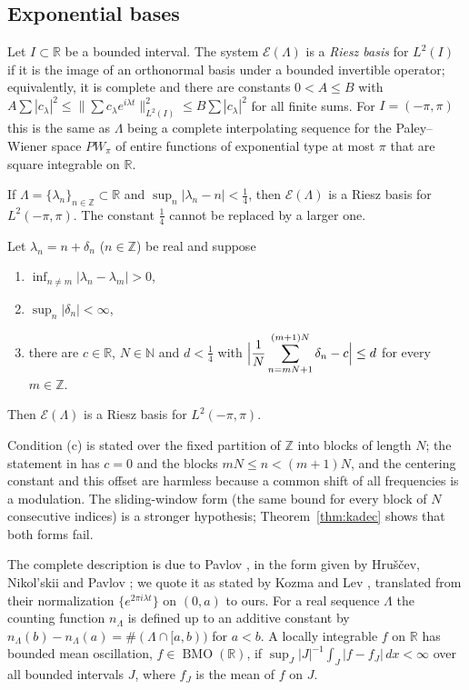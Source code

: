 \documentclass[11pt]{article}
\DeclareMathOperator{\BMO}{BMO}
\newcommand{\R}{\mathbb{R}}
\newcommand{\Z}{\mathbb{Z}}
\newcommand{\N}{\mathbb{N}}
\newcommand{\Lam}{\Lambda}
\newcommand{\E}{\mathcal{E}}
\begin{document}
\subsection{Exponential bases}
Let $I\subset\R$ be a bounded interval. The system $\E(\Lam)$ is a \emph{Riesz basis} for $L^2(I)$ if it is the image of an orthonormal basis under a bounded invertible operator; equivalently, it is complete and there are constants $0<A\le B$ with $A\sum|c_\lambda|^2\le\|\sum c_\lambda e^{i\lambda t}\|_{L^2(I)}^2\le B\sum|c_\lambda|^2$ for all finite sums. For $I=(-\pi,\pi)$ this is the same as $\Lam$ being a complete interpolating sequence for the Paley--Wiener space $PW_\pi$ of entire functions of exponential type at most $\pi$ that are square integrable on $\R$.

\begin{theorem}\label{thm:Kadec}
If $\Lam=\{\lambda_n\}_{n\in\Z}\subset\R$ and $\sup_n|\lambda_n-n|<\frac14$, then $\E(\Lam)$ is a Riesz basis for $L^2(-\pi,\pi)$. The constant $\frac14$ cannot be replaced by a larger one.
\end{theorem}

\begin{theorem}\label{thm:Avdonin}
Let $\lambda_n=n+\delta_n$ ($n\in\Z$) be real and suppose
\begin{enumerate}
\item[(a)] $\inf_{n\ne m}|\lambda_n-\lambda_m|>0$,
\item[(b)] $\sup_n|\delta_n|<\infty$,
\item[(c)] there are $c\in\R$, $N\in\N$ and $d<\frac14$ with $\displaystyle\Bigl|\frac1N\sum_{n=mN+1}^{(m+1)N}\delta_n-c\Bigr|\le d$ for every $m\in\Z$.
\end{enumerate}
Then $\E(\Lam)$ is a Riesz basis for $L^2(-\pi,\pi)$.
\end{theorem}

Condition (c) is stated over the fixed partition of $\Z$ into blocks of length $N$; the statement in \cite{AlemanyNitzan} has $c=0$ and the blocks $mN\le n<(m+1)N$, and the centering constant and this offset are harmless because a common shift of all frequencies is a modulation. The sliding-window form (the same bound for every block of $N$ consecutive indices) is a stronger hypothesis; Theorem~\ref{thm:kadec} shows that both forms fail.

The complete description is due to Pavlov \cite{Pavlov79}, in the form given by Hru\v{s}\v{c}ev, Nikol'skii and Pavlov \cite[p.~240]{HNP}; we quote it as stated by Kozma and Lev \cite[Theorem 5.1]{KozmaLev}, translated from their normalization $\{e^{2\pi i\lambda t}\}$ on $(0,a)$ to ours. For a real sequence $\Lam$ the counting function $n_\Lam$ is defined up to an additive constant by $n_\Lam(b)-n_\Lam(a)=\#(\Lam\cap[a,b))$ for $a<b$. A locally integrable $f$ on $\R$ has bounded mean oscillation, $f\in\BMO(\R)$, if $\sup_J|J|^{-1}\int_J|f-f_J|\,dx<\infty$ over all bounded intervals $J$, where $f_J$ is the mean of $f$ on $J$.
\end{document}
